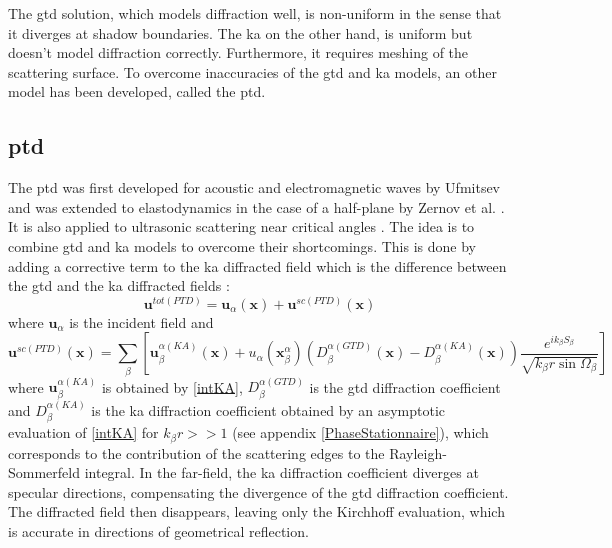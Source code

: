The \acrshort{gtd} solution, which models diffraction well, is non-uniform in the sense that it diverges at shadow boundaries. The \acrshort{ka} on the other hand, is uniform but doesn't model diffraction correctly. Furthermore, it requires meshing of the scattering surface. To overcome inaccuracies of the \acrshort{gtd} and \acrshort{ka} models, an other model has been developed, called the \acrfull{ptd}.

\subsection{\acrfull{ptd}}
The \acrfull{ptd} was first developed for acoustic and electromagnetic waves by Ufmitsev \cite{Ufmi} and was extended to elastodynamics in the case of a half-plane by Zernov et al. \cite{Zernov}. It is also applied to ultrasonic scattering near critical angles \cite{systmodel,FradkinDarmon}. The idea is to combine \acrshort{gtd} and \acrshort{ka} models to overcome their shortcomings. This is done by adding a corrective term to the \acrshort{ka} diffracted field which is the difference between the \acrshort{gtd} and the \acrshort{ka} diffracted fields :
\begin{equation}
\mathbf{u}^{tot (PTD)}=\mathbf{u}_{\alpha}(\mathbf{x})+\mathbf{u}^{sc (PTD)}(\mathbf{x})
\end{equation}
where $\mathbf{u}_{\alpha}$ is the incident field and
\begin{equation}
\mathbf{u}^{sc (PTD)}(\mathbf{x})=\sum_{\beta}\left[\mathbf{u}^{\alpha(KA)}_{\beta}(\mathbf{x})+u_{\alpha}(\mathbf{x}_{\beta}^{\alpha})\left(D_{\beta}^{\alpha(GTD)}(\mathbf{x})-D_{\beta}^{\alpha(KA)}(\mathbf{x})\right)\dfrac{e^{ik_{\beta}S_{\beta}}}{\sqrt{k_{\beta}r\sin\Omega_{\beta}}}\right]
\label{eqPTD}
\end{equation}
where  $\mathbf{u}^{\alpha(KA)}_{\beta}$ is obtained by \eqref{intKA}, $D_{\beta}^{\alpha(GTD)}$ is the \acrshort{gtd} diffraction coefficient and $D_{\beta}^{\alpha(KA)}$ is the \acrshort{ka} diffraction coefficient obtained by an asymptotic evaluation of \eqref{intKA} for $k_{\beta}r>>1$ (see appendix \ref{PhaseStationnaire}), which corresponds to the contribution of the scattering edges to the Rayleigh-Sommerfeld integral. In the far-field, the \acrshort{ka} diffraction coefficient diverges at specular directions, compensating the divergence of the \acrshort{gtd} diffraction coefficient. The diffracted field then disappears, leaving only the Kirchhoff evaluation, which is accurate in directions of geometrical reflection.

